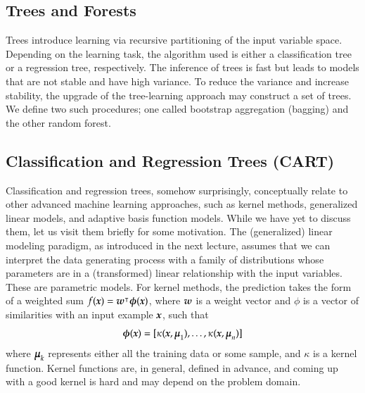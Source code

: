\begin{refsection}
\chapter{Trees and Forests}

\begin{summary}
Trees introduce learning via recursive partitioning of the input variable space. Depending on the learning task, the algorithm used is either a classification tree or a regression tree, respectively. The inference of trees is fast but leads to models that are not stable and have high variance. To reduce the variance and increase stability, the upgrade of the tree-learning approach may construct a set of trees. We define two such procedures; one called bootstrap aggregation (bagging) and the other random forest.
\end{summary}

\section{Classification and Regression Trees (CART)}

Classification and regression trees, somehow surprisingly, conceptually relate to other advanced machine learning approaches, such as kernel methods, generalized linear models, and adaptive basis function models. While we have yet to discuss them, let us visit them briefly for some motivation. The (generalized) linear modeling paradigm, as introduced in the next lecture, assumes that we can interpret the data generating process with a family of distributions whose parameters are in a (transformed) linear relationship with the input variables. These are parametric models. For kernel methods, the prediction takes the form of a weighted sum $f(\boldsymbol{x})=\boldsymbol{w}^\intercal\boldsymbol{\phi}(\boldsymbol{x})$, where $\boldsymbol{w}$ is a weight vector and $\phi$ is a vector of similarities with an input example $\boldsymbol{x}$, such that
$$ \boldsymbol{\phi}(\boldsymbol{x}) = [\kappa(\boldsymbol{x},\boldsymbol{\mu}_1), \ldots, \kappa(\boldsymbol{x},\boldsymbol{\mu}_n)] $$
where $\boldsymbol{\mu}_k$ represents either all the training data or some sample, and $\kappa$ is a kernel function. Kernel functions are, in general, defined in advance, and coming up with a good kernel is hard and may depend on the problem domain.


\end{refsection}
